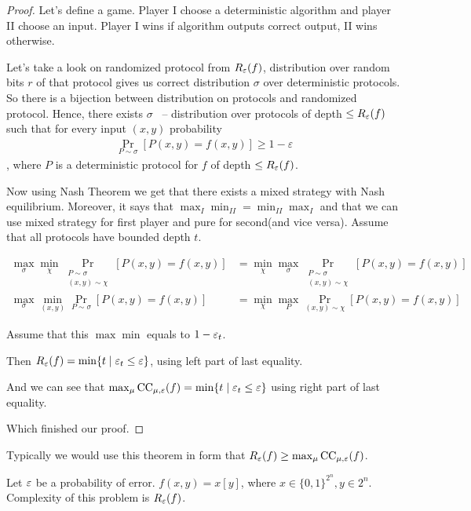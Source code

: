 \begin{proof}
	Let's define a game. Player I choose a deterministic algorithm and player II choose an input. Player I wins if algorithm outputs correct output, II wins otherwise.
	
	Let's take a look on randomized protocol from $R_\varepsilon(f)$, distribution over random bits $r$ of that protocol gives us correct distribution $\sigma$ over deterministic protocols. So there is a bijection between distribution on protocols and randomized protocol. Hence, there exists $\sigma$ ~-- distribution over protocols of depth $\leq R_\varepsilon(f)$ such that for every input $(x, y)$ probability 
	\begin{align*}
		\Pr_{P \sim \sigma} [P(x, y) = f(x, y)] \geq 1 - \varepsilon
	\end{align*}, where $P$ is a deterministic protocol for $f$ of depth $\leq R_\varepsilon(f)$.
	
	
 	Now using Nash Theorem we get that there exists a mixed strategy with Nash equilibrium. Moreover, it says that $\max_I \min_{II} = \min_{II} \max_I$ and that we can use mixed strategy for first player and pure for second(and vice versa).
	Assume that all protocols have bounded depth $t$.
	
	\begin{align*}
		\max_\sigma \min_\chi \Pr_{\substack{P \sim \sigma \\ (x, y) \sim \chi}}[P(x, y) = f(x, y)] &= \min_\chi \max_\sigma \Pr_{\substack{P \sim \sigma \\ (x, y) \sim \chi}}[P(x, y) = f(x, y)] \\
		\max_\sigma \min_{(x, y)} \Pr_{P \sim \sigma}[P(x, y) = f(x, y)] &= \min_\chi \max_{P} \Pr_{(x, y) \sim \chi}[P(x, y) = f(x, y)]
	\end{align*}
	
	Assume that this $\max \min$ equals to $1 - \varepsilon_t$.
	
	Then $R_\varepsilon(f) = \min \{t \mid \varepsilon_t \leq \varepsilon \}$, using left part of last equality.
	
	And we can see that $\max_\mu \operatorname{CC}_{\mu, \varepsilon}(f) = \min \{t \mid \varepsilon_t \leq \varepsilon\}$ using right part of last equality.
	
	Which finished our proof.
\end{proof}

Typically we would use this theorem in form that $R_\varepsilon(f) \geq \max_\mu \operatorname{CC}_{\mu, \varepsilon}(f)$.

\begin{df} \label{problem:INX}
	Let $\varepsilon$ be a probability of error. $f(x, y) = x[y]$, where $x \in \{0, 1\}^{2^n}, y \in 2^n$.
	Complexity of this problem is $R_\varepsilon(f)$.
\end{df}


